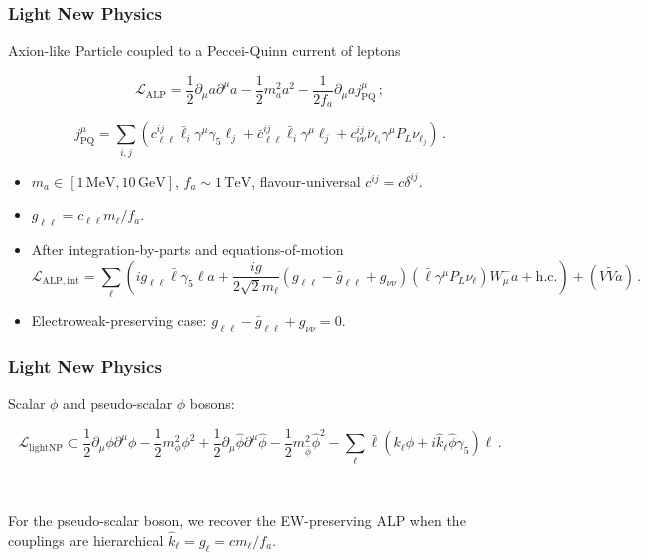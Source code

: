 \documentclass[mathserif, 10pt, aspectratio=169]{beamer}
\begin{document}
\begin{frame}\frametitle{Light New Physics}
    Axion-like Particle coupled to a Peccei-Quinn current of leptons

    $$\mathcal{L}_\mathrm{ALP} = \frac{1}{2}\partial_\mu a \partial^\mu a - \frac{1}{2} m_a^2 a^2 - \frac{1}{2 f_a}\partial_\mu a j^\mu_\mathrm{PQ}\,;$$

    $$j^\mu_\mathrm{PQ} = \sum_{i,j} \left( c_{\ell\ell}^{ij} \bar{\ell}_i\gamma^\mu \gamma_5 \ell_j + \bar{c}_{\ell\ell}^{ij} \bar{\ell}_i\gamma^\mu  \ell_j  + c_{\nu\nu}^{ij} \bar{\nu}_{\ell_i} \gamma^\mu P_L \nu_{\ell_j} \right)\,. $$

    \begin{itemize}
        \item $m_a \in [1\,\mathrm{MeV}, 10\,\mathrm{GeV}]$, $f_a \sim 1\,\mathrm{TeV}$, flavour-universal $c^{ij} = c \delta^{ij}$.
        
        \item $g_{\ell\ell} = c_{\ell\ell} m_\ell/f_a$.
        
        \item After integration-by-parts and equations-of-motion
        $$\mathcal{L}_\mathrm{ALP, int} = \sum_\ell \left(i g_{\ell\ell} \bar{\ell}\gamma_5\ell a + \frac{ig}{2 \sqrt{2} m_\ell} (g_{\ell\ell} - \bar{g}_{\ell\ell} + g_{\nu\nu}) (\bar{\ell}\gamma^\mu P_L \nu_\ell) W^-_\mu a + \mathrm{h.c.} \right) + (V\tilde{V}a)\,.$$

        \item Electroweak-preserving case: $g_{\ell\ell} - \bar{g}_{\ell\ell} + g_{\nu\nu}=0$.
    \end{itemize}
\end{frame}

\begin{frame}\frametitle{Light New Physics}

    Scalar $\phi$ and pseudo-scalar $\hat{\phi}$ bosons:

    $$\mathcal{L}_\mathrm{light NP} \subset \frac{1}{2}\partial_\mu \phi \partial^\mu \phi - \frac{1}{2} m_\phi^2 \phi^2 + \frac{1}{2}\partial_\mu \hat{\phi} \partial^\mu \hat{\phi} - \frac{1}{2} m_{\hat{\phi}}^2 \hat{\phi}^2 - \sum_\ell \bar{\ell}(k_\ell \phi + i \hat{k}_\ell \hat{\phi}\gamma_5) \ell\,.$$

    ~
    
    For the pseudo-scalar boson, we recover the EW-preserving ALP when the couplings are hierarchical $\hat{k}_\ell = g_\ell = c m_\ell/f_a$.
\end{frame}
\end{document}
